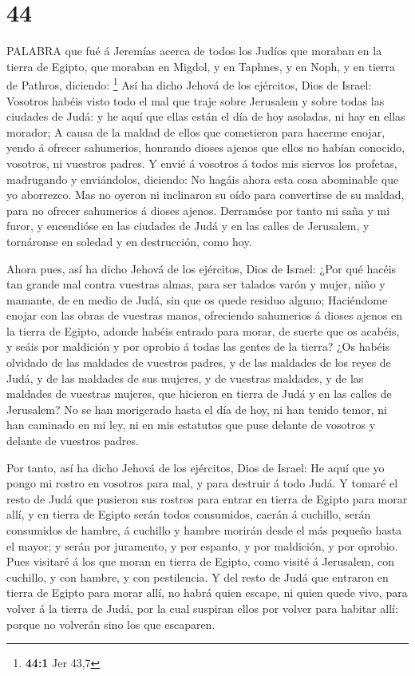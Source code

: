 \hypertarget{section-43}{%
\section{44}\label{section-43}}

 PALABRA que fué á Jeremías acerca de todos los Judíos que
moraban en la tierra de Egipto, que moraban en Migdol, y en Taphnes, y
en Noph, y en tierra de Pathros, diciendo: \footnote{\textbf{44:1} Jer
  43,7}  Así ha dicho Jehová de los ejércitos, Dios de
Israel: Vosotros habéis visto todo el mal que traje sobre Jerusalem y
sobre todas las ciudades de Judá: y he aquí que ellas están el día de
hoy asoladas, ni hay en ellas morador;  A causa de la maldad
de ellos que cometieron para hacerme enojar, yendo á ofrecer sahumerios,
honrando dioses ajenos que ellos no habían conocido, vosotros, ni
vuestros padres.  Y envié á vosotros á todos mis siervos los
profetas, madrugando y enviándolos, diciendo: No hagáis ahora esta cosa
abominable que yo aborrezco.  Mas no oyeron ni inclinaron su
oído para convertirse de su maldad, para no ofrecer sahumerios á dioses
ajenos.  Derramóse por tanto mi saña y mi furor, y
encendióse en las ciudades de Judá y en las calles de Jerusalem, y
tornáronse en soledad y en destrucción, como hoy.

 Ahora pues, así ha dicho Jehová de los ejércitos, Dios de
Israel: ¿Por qué hacéis tan grande mal contra vuestras almas, para ser
talados varón y mujer, niño y mamante, de en medio de Judá, sin que os
quede residuo alguno;  Haciéndome enojar con las obras de
vuestras manos, ofreciendo sahumerios á dioses ajenos en la tierra de
Egipto, adonde habéis entrado para morar, de suerte que os acabéis, y
seáis por maldición y por oprobio á todas las gentes de la tierra?
 ¿Os habéis olvidado de las maldades de vuestros padres, y
de las maldades de los reyes de Judá, y de las maldades de sus mujeres,
y de vuestras maldades, y de las maldades de vuestras mujeres, que
hicieron en tierra de Judá y en las calles de Jerusalem? 
No se han morigerado hasta el día de hoy, ni han tenido temor, ni han
caminado en mi ley, ni en mis estatutos que puse delante de vosotros y
delante de vuestros padres.

 Por tanto, así ha dicho Jehová de los ejércitos, Dios de
Israel: He aquí que yo pongo mi rostro en vosotros para mal, y para
destruir á todo Judá.  Y tomaré el resto de Judá que
pusieron sus rostros para entrar en tierra de Egipto para morar allí, y
en tierra de Egipto serán todos consumidos, caerán á cuchillo, serán
consumidos de hambre, á cuchillo y hambre morirán desde el más pequeño
hasta el mayor; y serán por juramento, y por espanto, y por maldición, y
por oprobio.  Pues visitaré á los que moran en tierra de
Egipto, como visité á Jerusalem, con cuchillo, y con hambre, y con
pestilencia.  Y del resto de Judá que entraron en tierra de
Egipto para morar allí, no habrá quien escape, ni quien quede vivo, para
volver á la tierra de Judá, por la cual suspiran ellos por volver para
habitar allí: porque no volverán sino los que escaparen.

